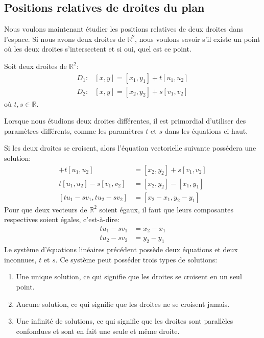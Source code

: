 \documentclass[]{book}
\providecommand{\tightlist}{%
  \setlength{\itemsep}{0pt}\setlength{\parskip}{0pt}}
\theoremstyle{definition}
\theoremstyle{definition}
\theoremstyle{definition}
\theoremstyle{remark}
\let\BeginKnitrBlock\begin \let\EndKnitrBlock\end
\begin{document}
\hypertarget{positions-relatives-de-droites-du-plan}{%
\subsection{Positions relatives de droites du plan}\label{positions-relatives-de-droites-du-plan}}

Nous voulons maintenant étudier les positions relatives de deux droites dans l'espace. Si nous avons deux droites de \(\mathbb{R}^2\), nous voulons savoir s'il existe un point où les deux droites s'intersectent et si oui, quel est ce point.

Soit deux droites de \(\mathbb{R}^2\):
\begin{align*}
D_1 :& [x,y] = [x_1,y_1] + t[u_1,u_2] \\
D_2 :& [x,y] = [x_2,y_2] + s[v_1,v_2]
\end{align*}
où \(t,s\in\mathbb{R}\).

\BeginKnitrBlock{remark}
{}Lorsque nous étudions deux droites différentes, il est primordial d'utiliser des paramètres différents, comme les paramètres \(t\) et \(s\) dans les équations ci-haut.
\EndKnitrBlock{remark}

Si les deux droites se croisent, alors l'équation vectorielle suivante possédera une solution:
\begin{align*}
[x_1,y_1] + t[u_1,u_2] &= [x_2,y_2] + s[v_1,v_2] \\
t[u_1,u_2]-s[v_1,v_2] &= [x_2,y_2]-[x_1,y_1] \\
[tu_1-sv_1,tu_2-sv_2] &= [x_2-x_1,y_2-y_1]
\end{align*}
Pour que deux vecteurs de \(\mathbb{R}^2\) soient égaux, il faut que leurs composantes respectives soient égales, c'est-à-dire:
\begin{align*}
tu_1-sv_1 &= x_2-x_1 \\
tu_2-sv_2 &= y_2-y_1
\end{align*}
Le système d'équations linéaires précédent possède deux équations et deux inconnues, \(t\) et \(s\). Ce système peut posséder trois types de solutions:

\begin{enumerate}
\def\labelenumi{\arabic{enumi}.}
\tightlist
\item
  Une unique solution, ce qui signifie que les droites se croisent en un seul point.
\item
  Aucune solution, ce qui signifie que les droites ne se croisent jamais.
\item
  Une infinité de solutions, ce qui signifie que les droites sont parallèles confondues et sont en fait une seule et même droite.
\end{enumerate}
\end{document}
